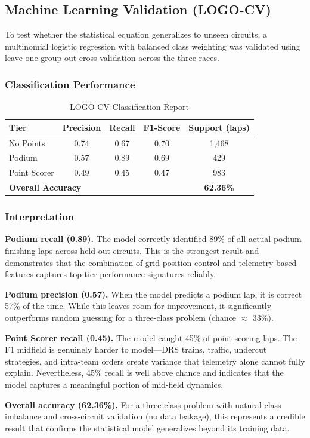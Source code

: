\subsection{Machine Learning Validation (LOGO-CV)}

To test whether the statistical equation generalizes to unseen circuits, a
multinomial logistic regression with balanced class weighting was validated
using leave-one-group-out cross-validation across the three races.

\subsubsection{Classification Performance}

\begin{table}[htbp]
  \centering
  \caption{LOGO-CV Classification Report}
  \label{tab:classification}
  \begin{tabular}{lcccc}
    \toprule
    \textbf{Tier} & \textbf{Precision} & \textbf{Recall} &
    \textbf{F1-Score} & \textbf{Support (laps)} \\
    \midrule
    No Points     & 0.74 & 0.67 & 0.70 & 1,468 \\
    Podium        & 0.57 & 0.89 & 0.69 & 429 \\
    Point Scorer  & 0.49 & 0.45 & 0.47 & 983 \\
    \midrule
    \multicolumn{4}{l}{\textbf{Overall Accuracy}} & \textbf{62.36\%} \\
    \bottomrule
  \end{tabular}
\end{table}

\subsubsection{Interpretation}

\textbf{Podium recall (0.89).} The model correctly identified 89\% of all
actual podium-finishing laps across held-out circuits. This is the strongest
result and demonstrates that the combination of grid position control and
telemetry-based features captures top-tier performance signatures reliably.

\textbf{Podium precision (0.57).} When the model predicts a podium lap, it
is correct 57\% of the time. While this leaves room for improvement, it
significantly outperforms random guessing for a three-class problem
(chance $\approx$ 33\%).

\textbf{Point Scorer recall (0.45).} The model caught 45\% of
point-scoring laps. The F1 midfield is genuinely harder to model---DRS
trains, traffic, undercut strategies, and intra-team orders create variance
that telemetry alone cannot fully explain. Nevertheless, 45\% recall is well
above chance and indicates that the model captures a meaningful portion of
mid-field dynamics.

\textbf{Overall accuracy (62.36\%).} For a three-class problem with natural
class imbalance and cross-circuit validation (no data leakage), this
represents a credible result that confirms the statistical model generalizes
beyond its training data.
